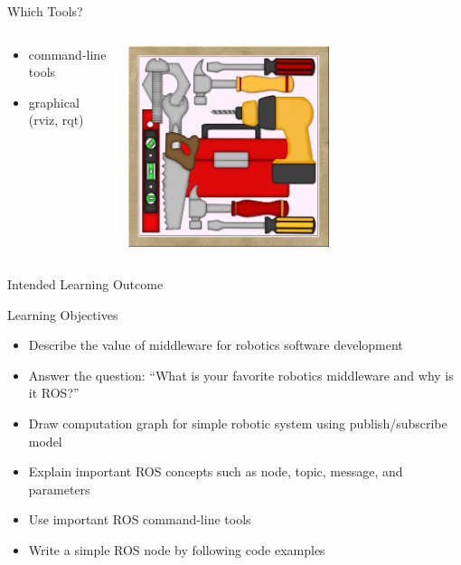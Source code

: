 \documentclass[aspectratio=43]{beamer}
\begin{document}
\begin{frame}{Which Tools?}
\begin{columns}
	\begin{column}{0.55\textwidth}
		\begin{itemize}
			\item command-line tools
                          \item graphical (rviz, rqt)              
		\end{itemize} 
        \end{column} 
        \begin{column}{0.45\textwidth} 
          \centering 
          \includegraphics[width=0.6\textwidth]{fig/tools.jpeg} 
        \end{column}
\end{columns}
\end{frame}

\begin{frame}{Intended Learning Outcome}
	\begin{block}{Learning Objectives}
		\begin{itemize}
			\item<0> Describe the value of middleware for robotics software development
			\item<1> Answer the question: ``What is your favorite robotics middleware and why is it ROS?''
			\item<0> Draw computation graph for simple robotic system using publish/subscribe model
			\item<0> Explain important ROS concepts such as node, topic, message, and parameters
			\item<0> Use important ROS command-line tools
			\item<0> Write a simple ROS node by following code examples
		\end{itemize}
	\end{block}
\end{frame}
\end{document}
